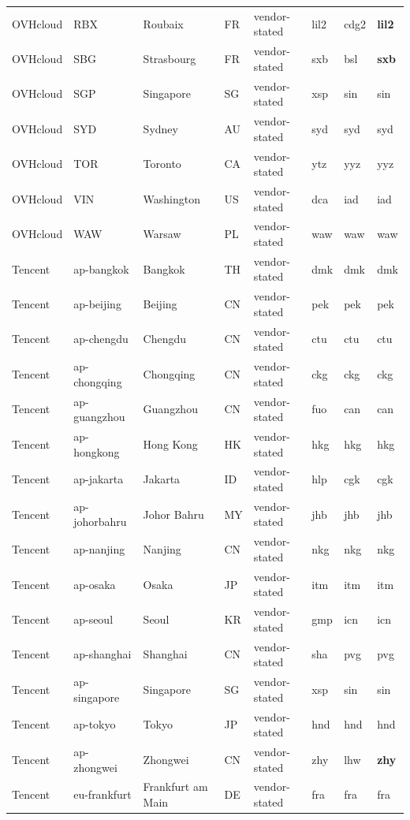 \begin{longtable}{llllllll}
OVHcloud & RBX & Roubaix & FR & vendor-stated & lil2 & cdg2 & \textbf{lil2} \\
OVHcloud & SBG & Strasbourg & FR & vendor-stated & sxb & bsl & \textbf{sxb} \\
OVHcloud & SGP & Singapore & SG & vendor-stated & xsp & sin & sin \\
OVHcloud & SYD & Sydney & AU & vendor-stated & syd & syd & syd \\
OVHcloud & TOR & Toronto & CA & vendor-stated & ytz & yyz & yyz \\
OVHcloud & VIN & Washington & US & vendor-stated & dca & iad & iad \\
OVHcloud & WAW & Warsaw & PL & vendor-stated & waw & waw & waw \\
Tencent & ap-bangkok & Bangkok & TH & vendor-stated & dmk & dmk & dmk \\
Tencent & ap-beijing & Beijing & CN & vendor-stated & pek & pek & pek \\
Tencent & ap-chengdu & Chengdu & CN & vendor-stated & ctu & ctu & ctu \\
Tencent & ap-chongqing & Chongqing & CN & vendor-stated & ckg & ckg & ckg \\
Tencent & ap-guangzhou & Guangzhou & CN & vendor-stated & fuo & can & can \\
Tencent & ap-hongkong & Hong Kong & HK & vendor-stated & hkg & hkg & hkg \\
Tencent & ap-jakarta & Jakarta & ID & vendor-stated & hlp & cgk & cgk \\
Tencent & ap-johorbahru & Johor Bahru & MY & vendor-stated & jhb & jhb & jhb \\
Tencent & ap-nanjing & Nanjing & CN & vendor-stated & nkg & nkg & nkg \\
Tencent & ap-osaka & Osaka & JP & vendor-stated & itm & itm & itm \\
Tencent & ap-seoul & Seoul & KR & vendor-stated & gmp & icn & icn \\
Tencent & ap-shanghai & Shanghai & CN & vendor-stated & sha & pvg & pvg \\
Tencent & ap-singapore & Singapore & SG & vendor-stated & xsp & sin & sin \\
Tencent & ap-tokyo & Tokyo & JP & vendor-stated & hnd & hnd & hnd \\
Tencent & ap-zhongwei & Zhongwei & CN & vendor-stated & zhy & lhw & \textbf{zhy} \\
Tencent & eu-frankfurt & Frankfurt am Main & DE & vendor-stated & fra & fra & fra \\

\end{longtable}
